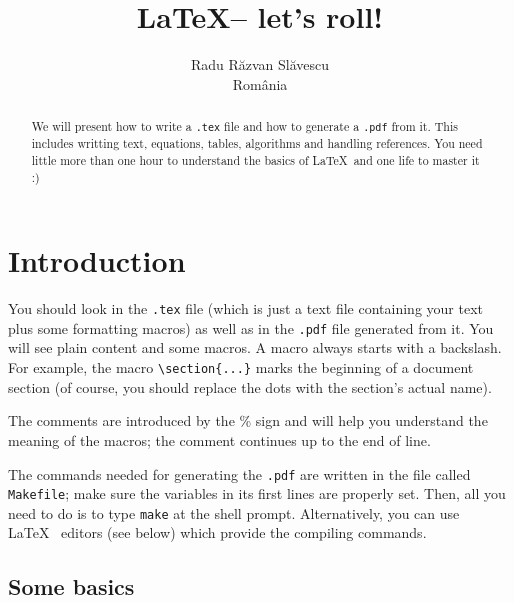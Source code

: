 \documentclass[11pt,a4paper,twoside,notitlepage]{article}
\begin{document}
\title{\LaTeX -- let's roll!}

\author{
Radu R\u{a}zvan Sl\u{a}vescu\\ %
Rom\^{a}nia\\
}

\maketitle 

\begin{abstract}
We will present how to write a \texttt{.tex} file and how to generate a \texttt{.pdf} from it.
This includes writting text, equations, tables, algorithms and handling references.
You need little more than one hour to understand the basics of \LaTeX\ and one life to master it :)
\end{abstract} 

\section{Introduction}

You should look in the \texttt{.tex} file (which is just a text file containing your text plus some formatting macros)
as well as in the \texttt{.pdf} file generated from it. 
You will see plain content and some macros. 
A macro always starts with a backslash. For example, the macro \verb|\section{...}| %
marks the beginning of a document section (of course, you should replace the dots with the section's actual name). 

The comments are introduced by the \% sign and will help you understand the meaning of the macros; the comment continues up to the end of line. 

The commands needed for generating the \texttt{.pdf} are written in the file called \texttt{Makefile}; 
make sure the variables in its first lines are properly set. 
Then, all you need to do is to type \texttt{make} at the shell prompt.
Alternatively, you can use \LaTeX\ %
editors (see below) which provide the compiling commands. 

\subsection{Some basics}  %
\end{document}
